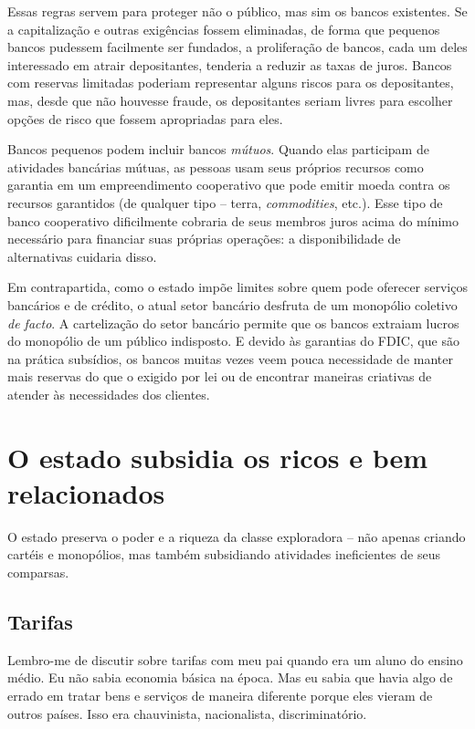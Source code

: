 Essas regras servem para proteger não o público, mas sim os bancos existentes. Se a capitalização e outras exigências fossem eliminadas, de forma que pequenos bancos pudessem facilmente ser fundados, a proliferação de bancos, cada um deles interessado em atrair depositantes, tenderia a reduzir as taxas de juros. Bancos com reservas limitadas poderiam representar alguns riscos para os depositantes, mas, desde que não houvesse fraude, os depositantes seriam livres para escolher opções de risco que fossem apropriadas para eles.

Bancos pequenos podem incluir bancos \emph{mútuos}. Quando elas participam de atividades bancárias mútuas, as pessoas usam seus próprios recursos como garantia em um empreendimento cooperativo que pode emitir moeda contra os recursos garantidos (de qualquer tipo -- terra, \emph{commodities}, etc.). Esse tipo de banco cooperativo dificilmente cobraria de seus membros juros acima do mínimo necessário para financiar suas próprias operações: a disponibilidade de alternativas cuidaria disso.

Em contrapartida, como o estado impõe limites sobre quem pode oferecer serviços bancários e de crédito, o atual setor bancário desfruta de um monopólio coletivo \emph{de facto}. A cartelização do setor bancário permite que os bancos extraiam lucros do monopólio de um público indisposto. E devido às garantias do FDIC, que são na prática subsídios, os bancos muitas vezes veem pouca necessidade de manter mais reservas do que o exigido por lei ou de encontrar maneiras criativas de atender às necessidades dos clientes.

\section{O estado subsidia os ricos e bem relacionados}

O estado preserva o poder e a riqueza da classe exploradora -- não apenas criando cartéis e monopólios, mas também subsidiando atividades ineficientes de seus comparsas.

\subsection*{Tarifas}

Lembro-me de discutir sobre tarifas com meu pai quando era um aluno do ensino médio. Eu não sabia economia básica na época. Mas eu sabia que havia algo de errado em tratar bens e serviços de maneira diferente porque eles vieram de outros países. Isso era chauvinista, nacionalista, discriminatório.

